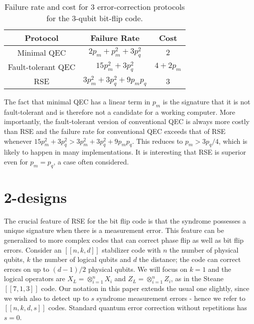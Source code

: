 \documentclass[reprint, superscriptaddress]{revtex4-1}
\numberwithin{equation}{section}
\numberwithin{figure}{section}
\numberwithin{table}{section}
\begin{document}
\begin{table} 
	\begin{tabular}{c|c|c}

	Protocol & Failure Rate & Cost \\
	\hline\hline
	Minimal QEC & $2p_m + p_m^2 + 3p_q^2$  &  $2$ \\
	Fault-tolerant QEC  & $15 p_m^2 + 3 p_q^2$  &  $4 + 2 p_m$  \\
	RSE  &  $3p_m^2 + 3 p_q^2 + 9 p_m p_q$  &  3\\
	\end{tabular}
	\caption {Failure rate and cost for 3 error-correction protocols 
	for the 3-qubit bit-flip code.}
	\label{Table1}
\end{table}

The fact that minimal QEC has a linear term in $p_m$ is the signature that it is not fault-tolerant and is therefore not a candidate for a working computer.  More importantly, the fault-tolerant version of conventional QEC is always more costly than RSE and the failure rate for conventional QEC exceeds that of RSE whenever $15p_m^2 + 3 p_q^2 > 3 p_m^2 + 3 p_q^2 + 9 p_m p_q$.  This reduces to $p_m > 3 p_q /4$, which is likely to happen in many implementations.  It is interesting that RSE is superior even for $p_m = p_q$, a case often considered.  

\section{2-designs}

The crucial feature of RSE for the bit flip code is that the syndrome possesses a unique signature when there is a measurement error.  This feature can be generalized to more complex codes that can correct phase flip as well as bit flip errors.  Consider an $[[n,k,d]]$ stabilizer code with $n$ the number of physical qubits, $k$ the number of logical qubits and $d$ the distance; the code can correct errors on up to $(d-1)/2$ physical qubits.  We will focus on $k=1$ and the logical operators are $X_L=\otimes_{i=1}^{n} X_i$ and $Z_L=\otimes_{i=1}^{n} Z_i$, as in the Steane $[[7,1,3]]$ code.  Our notation in this paper extends the usual one slightly, since we wish also to detect up to $s$ syndrome measurement errors - hence we refer to $[[n,k,d,s]]$ codes.  Standard quantum error correction without repetitions has $s=0$.  
\end{document}
